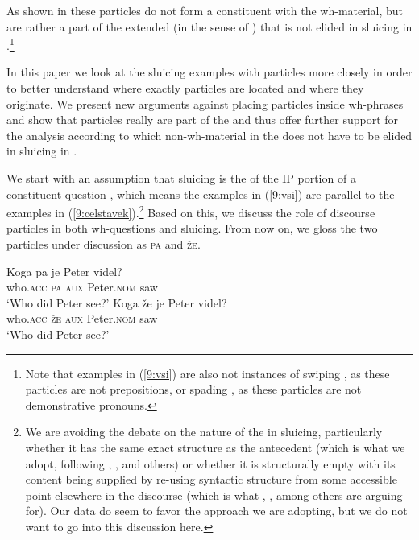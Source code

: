 \documentclass[output=paper,modfonts,newtxmath,hidelinks]{langscibook}
\begin{document}
\noindent As shown in \cite{marusicetal2015} these particles do not form a constituent with the wh-material, but are rather a part of the extended  (in the sense of \citealt{rizzi1997}) that is not elided in sluicing in .\footnote{Note that examples in (\ref{9:vsi}) are also not instances of swiping \citep{merchant2002swiping}, as these particles are not prepositions, or spading \citep{van2010syntax}, as these particles are not demonstrative pronouns.}

In this paper we look at the sluicing examples with particles more closely in order to better understand where exactly particles are located and where they originate. We present new arguments against placing particles inside wh-phrases and show that particles really are part of the  and thus offer further support for the analysis according to which non-wh-material in the  does not have to be elided in sluicing in  \citep{marusicetal2015}.

We start with an assumption that sluicing is the  of the IP portion of a constituent question \citep{ross1969,merchant2001,merchant2006},  which means the examples in (\ref{9:vsi}) are parallel to the examples in (\ref{9:celstavek}).\footnote{We are avoiding the debate on the nature of the  in sluicing, particularly whether it has the same exact structure as the antecedent (which is what we adopt, following \citealt{ross1969}, \citealt{merchant2001}, and others) or whether it is structurally empty with its content being supplied by re-using syntactic structure from some accessible point elsewhere in the discourse (which is what \citealt{chungetal1995}, \citeyear{chungetal2011}, among others are arguing for). Our data do seem to favor the approach we are adopting, but we do not want to go into this discussion here.} Based on this, we discuss the role of discourse particles in both wh-questions and sluicing. From now on, we gloss the two  particles under discussion as \textsc{pa} and \textsc{že}.

\begin{exe}
\ex\label{9:celstavek}
\begin{xlist}
 \ex 
 \gll Koga pa je Peter 	videl?\\
 who.\textsc{acc} \textsc{pa} \textsc{aux} Peter.\textsc{nom} saw\\
 \trans `Who did Peter see?'
 \ex 
 \gll Koga že je Peter videl? \\
 who.\textsc{acc} \textsc{že}  \textsc{aux} Peter.\textsc{nom} saw\\
 \trans `Who did Peter see?'
 \end{xlist}
\end{exe}
\end{document}
